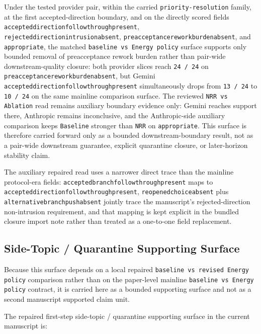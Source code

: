 \documentclass[11pt]{article}
\renewcommand{\_}{\textunderscore\hspace{0pt}}
\renewenvironment{quote}
  {\list{}{\leftmargin1em\rightmargin1em}\item\relax\small\sloppy}
  {\endlist}
\begin{document}
\begin{quote}
Under the tested provider pair, within the carried \texttt{priority-resolution}
family, at the first accepted-direction boundary, and on the directly scored fields
\texttt{accepted\_direction\_followthrough\_present},
\texttt{rejected\_direction\_intrusion\_absent},
\texttt{preacceptance\_rework\_burden\_absent}, and \texttt{appropriate}, the
matched \texttt{baseline vs Energy policy} surface supports only bounded
removal of preacceptance rework burden rather than pair-wide downstream-quality
closure: both provider slices reach \texttt{24 / 24} on
\texttt{preacceptance\_rework\_burden\_absent}, but Gemini
\texttt{accepted\_direction\_followthrough\_present} simultaneously drops from
\texttt{13 / 24} to \texttt{10 / 24} on the same mainline comparison surface.
The
reviewed \texttt{NRR vs Ablation} read remains auxiliary boundary evidence
only: Gemini reaches support there, Anthropic remains inconclusive, and the
Anthropic-side auxiliary comparison keeps \texttt{Baseline} stronger than
\texttt{NRR} on \texttt{appropriate}. This surface is therefore carried forward
only as a bounded downstream-boundary result, not as a pair-wide downstream
guarantee, explicit quarantine closure, or later-horizon stability claim.
\end{quote}

The auxiliary repaired read uses a narrower direct trace than the mainline
protocol-era fields: \texttt{accepted\_branch\_followthrough\_present} maps to
\texttt{accepted\_direction\_followthrough\_present},
\texttt{reopened\_choice\_absent} plus
\texttt{alternative\_branch\_push\_absent} jointly trace the manuscript's
rejected-direction non-intrusion requirement, and that mapping is kept explicit
in the bundled closure import note rather than treated as a one-to-one field
replacement.

\subsection{Side-Topic / Quarantine Supporting Surface}

Because this surface depends on a local repaired
\texttt{baseline vs revised Energy policy} comparison rather than on the
paper-level mainline \texttt{baseline vs Energy policy} contract, it is carried
here as a bounded supporting surface and not as a second manuscript supported
claim unit.

The repaired first-step side-topic / quarantine supporting surface in the
current manuscript is:
\end{document}
